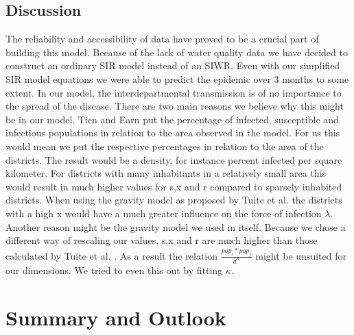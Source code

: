 \documentclass[11pt]{article}
\begin{document}
{\subsection{Discussion} 
The reliability and accessibility of data have proved to be a crucial part of building this model. Because of the lack of water quality data we have decided to construct an ordinary SIR model instead of an SIWR. Even with our simplified SIR model equations we were able to predict the epidemic over 3 months to some extent. In our model, the interdepartmental transmission is of no importance to the spread of the disease. There are two main reasons we believe why this might be in our model. Tien and Earn \cite{tien:2010} put the percentage of infected, susceptible and infectious populations in relation to the area observed in the model. For us this would mean we put the respective percentages in relation to the area of the districts. The result would be a density, for instance percent infected per square kilometer. For districts with many inhabitants in a relatively small area this would result in much higher values for s,x and r compared to sparsely inhabited districts. When using the gravity model as proposed by Tuite et al. \cite{tuite:2011} the districts with a high x would have a much greater influence on the force of infection $\lambda$.\\
Another reason might be the gravity model we used in itself. Because we chose a different way of rescaling our values, s,x and r are much higher than those calculated by Tuite et al. \cite{tuite:2011}. As a result the relation $\frac{pop_{i}*pop_{j}}{d^{n}}$ might be unsuited for our dimensions. We tried to even this out by fitting $\kappa$.






\section{Summary and Outlook}

}
\end{document}
